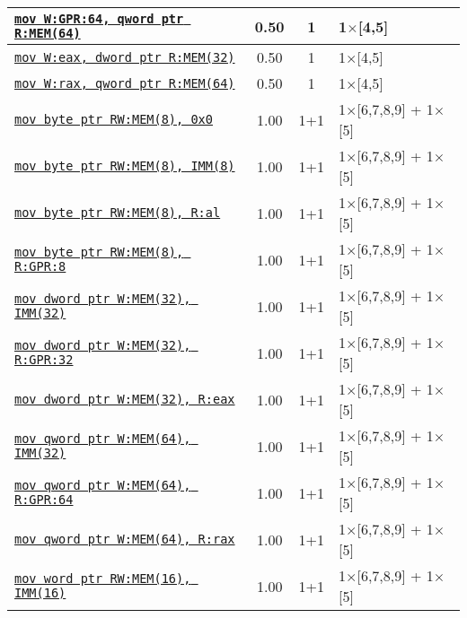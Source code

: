 \documentclass[a4paper,english,fontsize=9]{scrartcl}
\begin{document}
\begin{longtable}{p{}ccL{.25\textwidth}}
  \midrule
  \texttt{\href{https://felixcloutier.com/x86/MOV.html}{mov W:GPR:64, qword ptr R:MEM(64)}} & 0.50 & 1 & 1\(\times\)[4,5] \\
  \midrule
  \texttt{\href{https://felixcloutier.com/x86/MOV.html}{mov W:eax, dword ptr R:MEM(32)}} & 0.50 & 1 & 1\(\times\)[4,5] \\
  \midrule
  \texttt{\href{https://felixcloutier.com/x86/MOV.html}{mov W:rax, qword ptr R:MEM(64)}} & 0.50 & 1 & 1\(\times\)[4,5] \\
  \midrule
  \texttt{\href{https://felixcloutier.com/x86/MOV.html}{mov byte ptr RW:MEM(8), 0x0}} & 1.00 & 1+1 & 1\(\times\)[6,7,8,9] + 1\(\times\)[5] \\
  \midrule
  \texttt{\href{https://felixcloutier.com/x86/MOV.html}{mov byte ptr RW:MEM(8), IMM(8)}} & 1.00 & 1+1 & 1\(\times\)[6,7,8,9] + 1\(\times\)[5] \\
  \midrule
  \texttt{\href{https://felixcloutier.com/x86/MOV.html}{mov byte ptr RW:MEM(8), R:al}} & 1.00 & 1+1 & 1\(\times\)[6,7,8,9] + 1\(\times\)[5] \\
  \midrule
  \texttt{\href{https://felixcloutier.com/x86/MOV.html}{mov byte ptr RW:MEM(8), R:GPR:8}} & 1.00 & 1+1 & 1\(\times\)[6,7,8,9] + 1\(\times\)[5] \\
  \midrule
  \texttt{\href{https://felixcloutier.com/x86/MOV.html}{mov dword ptr W:MEM(32), IMM(32)}} & 1.00 & 1+1 & 1\(\times\)[6,7,8,9] + 1\(\times\)[5] \\
  \midrule
  \texttt{\href{https://felixcloutier.com/x86/MOV.html}{mov dword ptr W:MEM(32), R:GPR:32}} & 1.00 & 1+1 & 1\(\times\)[6,7,8,9] + 1\(\times\)[5] \\
  \midrule
  \texttt{\href{https://felixcloutier.com/x86/MOV.html}{mov dword ptr W:MEM(32), R:eax}} & 1.00 & 1+1 & 1\(\times\)[6,7,8,9] + 1\(\times\)[5] \\
  \midrule
  \texttt{\href{https://felixcloutier.com/x86/MOV.html}{mov qword ptr W:MEM(64), IMM(32)}} & 1.00 & 1+1 & 1\(\times\)[6,7,8,9] + 1\(\times\)[5] \\
  \midrule
  \texttt{\href{https://felixcloutier.com/x86/MOV.html}{mov qword ptr W:MEM(64), R:GPR:64}} & 1.00 & 1+1 & 1\(\times\)[6,7,8,9] + 1\(\times\)[5] \\
  \midrule
  \texttt{\href{https://felixcloutier.com/x86/MOV.html}{mov qword ptr W:MEM(64), R:rax}} & 1.00 & 1+1 & 1\(\times\)[6,7,8,9] + 1\(\times\)[5] \\
  \midrule
  \texttt{\href{https://felixcloutier.com/x86/MOV.html}{mov word ptr RW:MEM(16), IMM(16)}} & 1.00 & 1+1 & 1\(\times\)[6,7,8,9] + 1\(\times\)[5] \\

\end{longtable}
\end{document}
